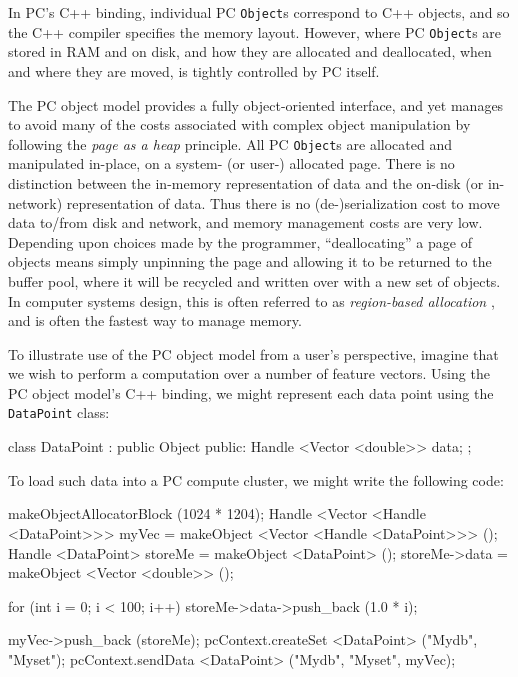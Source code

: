In PC's C++ binding, individual PC \texttt{Object}s correspond to C++ objects, and so the C++ compiler specifies the memory layout.
However, where PC \texttt{Object}s are stored in RAM and on disk, and how they are allocated and deallocated, when and where they are moved, is
tightly controlled by PC itself.

The PC object model provides a fully object-oriented interface, and yet manages to avoid many of the costs associated with complex object manipulation
by following the \emph{page as a heap} principle.  
All PC \texttt{Object}s are allocated and manipulated in-place, on a system-
(or user-) allocated page.  There is
no distinction between the in-memory representation of data and the on-disk (or in-network) representation of
data. Thus there is no (de-)serialization cost to move data to/from disk and network, and memory management costs are very low. Depending upon choices made by the
programmer, ``deallocating'' a page of objects
means simply unpinning the page and allowing it to be returned to the buffer
pool, where it will be recycled and written over with a new set of objects.  
In computer systems design, this is often referred to as
\emph{region-based allocation} \cite{tofte1997region,
  grossman2002region}, and is often the fastest way to manage
memory. 

To illustrate use of the PC object model from a user's perspective,
imagine that we wish to perform a computation over a number of feature vectors.  
Using the PC object model's C++ binding, we might represent each data point using the 
\texttt{DataPoint} class:

\begin{codesmall}
class DataPoint : public Object {
public:
	Handle <Vector <double>> data;
};
\end{codesmall}

\noindent
To load such data into a PC compute cluster, we might write the following code:

\begin{codesmall}
makeObjectAllocatorBlock (1024 * 1204);
Handle <Vector <Handle <DataPoint>>> myVec = 
     makeObject <Vector <Handle <DataPoint>>> ();
Handle <DataPoint> storeMe = makeObject <DataPoint> ();
storeMe->data = makeObject <Vector <double>> ();

for (int i = 0; i < 100; i++) 
     storeMe->data->push_back (1.0 * i);

myVec->push_back (storeMe);
pcContext.createSet <DataPoint> ("Mydb", "Myset");
pcContext.sendData <DataPoint> ("Mydb", "Myset", myVec);
\end{codesmall}


